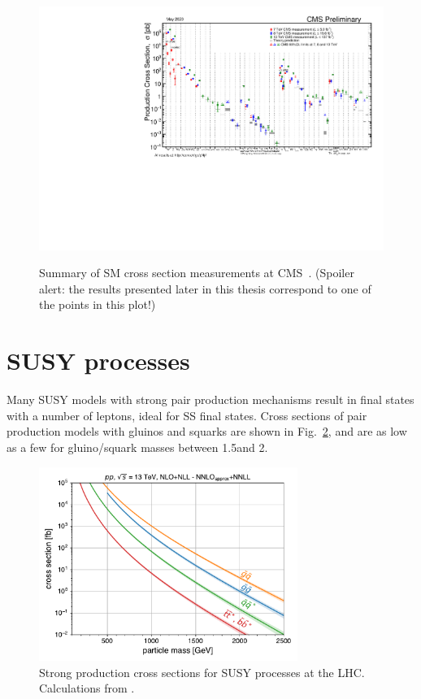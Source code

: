 \begin{figure}[!hbtp]
\centering
\includegraphics[width=.95\textwidth]{figs/misc/sm_xsecs.pdf} \\
\caption{Summary of SM cross section measurements at CMS~\cite{CMS:SMxsecs}.
(Spoiler alert: the results presented later in this thesis correspond to one
of the points in this plot!)
}
\label{fig:SMxsecs}
\end{figure}

\FloatBarrier

\section{SUSY processes}


Many SUSY models with strong pair production mechanisms result in
final states with a number of leptons, ideal for SS final states.
Cross sections of pair production models with gluinos and squarks 
are shown in Fig.~\ref{fig:susy_xsecs}, and are as low as a few \fbinv 
for gluino/squark masses between 1.5\TeV and 2\TeV.

\begin{figure}[htb!]
    \centering
    \includegraphics[width=0.75\textwidth]{figs/ssan/plot_susy_xsecs}
\caption{Strong production cross sections for SUSY processes at the LHC. Calculations from \cite{THEORY:SUSYxsecs}.}
\label{fig:susy_xsecs}
\end{figure}

